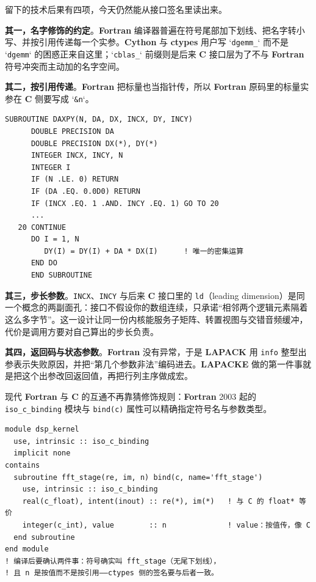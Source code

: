\documentclass[12pt,a4paper,fontset=fandol]{ctexbook}
\newcommand{\Tp}[1]{\texttt{#1}}
\newcommand{\Bk}{\allowbreak}
\newcommand{\Lib}[1]{\textbf{#1}}
\newcommand{\Lang}[1]{\textsf{\bfseries #1}}
\newcommand{\CL}{\Lang{C}}
\newcommand{\FTN}{\Lang{Fortran}}
\begin{document}
留下的技术后果有四项，今天仍然能从接口签名里读出来。

\textbf{其一，名字修饰的约定}。\FTN{} 编译器普遍在符号尾部加下划线、把名字转小写、并按引用传递每一个实参。\Lib{Cython} 与 \Lib{ctypes} 用户写 `\Tp{dgemm\_}` 而不是 `\Tp{dgemm}` 的困惑正来自这里；`\Tp{cblas\_}` 前缀则是后来 \CL{} 接口层为了不与 \FTN{} 符号冲突而主动加的名字空间。

\textbf{其二，按引用传递}。\FTN{} 把标量也当指针传，所以 \FTN{} 原码里的标量实参在 \CL{} 侧要写成 `\Tp{\&n}`。

\begin{lstlisting}[style=fortranstyle,caption={一段 \FTN{} 原码与它的调用形态：标量也是按引用传递},label={lst:ch02-fortran}]
      SUBROUTINE DAXPY(N, DA, DX, INCX, DY, INCY)
      DOUBLE PRECISION DA
      DOUBLE PRECISION DX(*), DY(*)
      INTEGER INCX, INCY, N
      INTEGER I
      IF (N .LE. 0) RETURN
      IF (DA .EQ. 0.0D0) RETURN
      IF (INCX .EQ. 1 .AND. INCY .EQ. 1) GO TO 20
      ...
   20 CONTINUE
      DO I = 1, N
         DY(I) = DY(I) + DA * DX(I)      ! 唯一的密集运算
      END DO
      END SUBROUTINE
\end{lstlisting}

\textbf{其三，步长参数}\Bk。\Tp{INCX}、\Tp{INCY} 与后来 \CL{} 接口里的 \Tp{ld}（leading dimension）是同一个概念的两副面孔：接口不假设你的数组连续，只承诺``相邻两个逻辑元素隔着这么多字节''。这一设计让同一份内核能服务子矩阵、转置视图与交错音频缓冲，代价是调用方要对自己算出的步长负责。

\textbf{其四，返回码与状态参数}。\FTN{} 没有异常，于是 \Lib{LAPACK} 用 \Tp{info} 整型出参表示失败原因，并把``第几个参数非法''编码进去。\Lib{LAPACKE} 做的第一件事就是把这个出参改回返回值，再把行列主序做成宏。

现代 \FTN{} 与 \CL{} 的互通不再靠猜修饰规则：\FTN{} 2003 起的 \Tp{iso\_c\_binding} 模块与 \Tp{bind(c)} 属性可以精确指定符号名与参数类型。

\begin{lstlisting}[style=fortranstyle,caption={用 \Tp{bind(c)} 把 \FTN{} 内核暴露成 \CL{} 符号},label={lst:ch02-iso}]
module dsp_kernel
  use, intrinsic :: iso_c_binding
  implicit none
contains
  subroutine fft_stage(re, im, n) bind(c, name='fft_stage')
    use, intrinsic :: iso_c_binding
    real(c_float), intent(inout) :: re(*), im(*)   ! 与 C 的 float* 等价
    integer(c_int), value        :: n              ! value：按值传，像 C
  end subroutine
end module
! 编译后要确认两件事：符号确实叫 fft_stage（无尾下划线），
! 且 n 是按值而不是按引用——ctypes 侧的签名要与后者一致。
\end{lstlisting}
\end{document}
